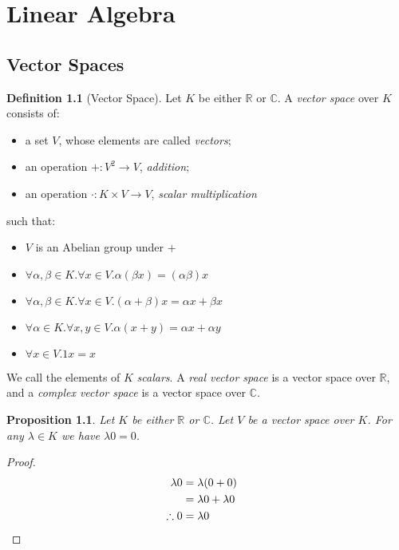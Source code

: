 \documentclass{book}
\let\qed\relax
\newtheorem{prop}[ax]{Proposition}
\theoremstyle{definition}
\newtheorem{df}[ax]{Definition}
\begin{document}
\chapter{Linear Algebra}

\section{Vector Spaces}

\begin{df}[Vector Space]
Let $K$ be either $\mathbb{R}$ or $\mathbb{C}$. A \emph{vector space} over $K$ consists of:
\begin{itemize}
\item a set $V$, whose elements are called \emph{vectors};
\item an operation $+ : V^2 \rightarrow V$, \emph{addition};
\item an operation $\cdot : K \times V \rightarrow V$, \emph{scalar multiplication}
\end{itemize}
such that:
\begin{itemize}
\item $V$ is an Abelian group under $+$
\item $\forall \alpha, \beta \in K. \forall x \in V. \alpha (\beta x) = (\alpha \beta) x$
\item $\forall \alpha, \beta \in K. \forall x \in V. (\alpha + \beta) x = \alpha x + \beta x$
\item $\forall \alpha \in K. \forall x,y \in V. \alpha (x + y) = \alpha x + \alpha y$
\item $\forall x \in V. 1x = x$
\end{itemize}

We call the elements of $K$ \emph{scalars}. A \emph{real vector space} is a vector space over $\mathbb{R}$, and a \emph{complex vector space} is a vector space over $\mathbb{C}$.
\end{df}

\begin{prop}
Let $K$ be either $\mathbb{R}$ or $\mathbb{C}$. Let $V$ be a vector space over $K$. For any $\lambda \in K$ we have $\lambda 0 = 0$.
\end{prop}

\begin{proof}
\pf\
\begin{align*}
\lambda 0 & = \lambda (0 + 0) \\
& = \lambda 0 + \lambda 0 \\
\therefore 0 & = \lambda 0 & \qed
\end{align*}
\end{proof}
\end{document}
